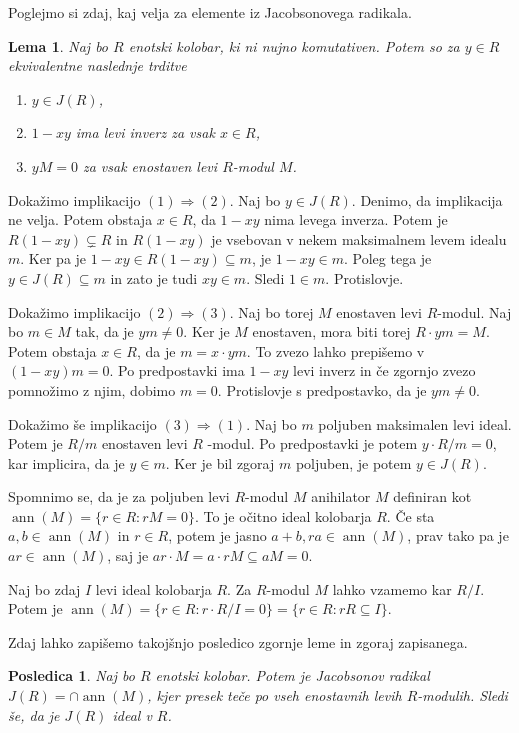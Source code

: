 \documentclass[a4paper, 12pt]{amsart}
\theoremstyle{definition} %
\theoremstyle{plain} %
\newtheorem{lema}[definicija]{Lema}
\newtheorem{posledica}[definicija]{Posledica}
\DeclareMathOperator{\ann}{ann}
\begin{document}
Poglejmo si zdaj, kaj velja za elemente iz Jacobsonovega radikala.
\begin{lema}
\label{J(R)-prvic}
Naj bo $R$ enotski kolobar, ki ni nujno komutativen. Potem so za $y\in R$ ekvivalentne naslednje trditve
 \begin{enumerate}
 \item $y\in J(R)$,
\item $1-xy$ ima levi inverz za vsak $x\in R$,
\item $ yM = 0$ za vsak enostaven levi $R$-modul $M$.
\end{enumerate}
\end{lema}

\proof
Dokažimo implikacijo $(1) \Rightarrow (2)$. Naj bo $y\in J(R)$. Denimo, da implikacija ne velja. Potem obstaja $x\in R$, da $1-xy$ nima levega inverza. Potem je $R(1-xy) \subsetneq R$ in $R(1-xy)$ je vsebovan v nekem maksimalnem levem idealu $m$. Ker pa je $1-xy \in R(1-xy) \subseteq m$, je $1-xy\in m$. Poleg tega je $y\in J(R) \subseteq m$ in zato je tudi $xy \in m$. Sledi $1\in m$. Protislovje.

Dokažimo implikacijo $(2) \Rightarrow (3)$. Naj bo torej $M$ enostaven levi $R$-modul. Naj bo $m\in M$ tak, da je $ym \neq 0$. Ker je $M$ enostaven, mora biti torej $R\cdot ym = M$. Potem obstaja $x\in R$, da je $m = x\cdot ym$. To zvezo lahko prepišemo v $(1-xy)m=0$. Po predpostavki ima $1-xy$ levi inverz in če zgornjo zvezo pomnožimo z njim, dobimo $m=0$. Protislovje s predpostavko, da je $ym\neq 0$.

Dokažimo še implikacijo $(3) \Rightarrow (1)$. Naj bo $m$ poljuben maksimalen levi ideal. Potem je $R/m$ enostaven levi $R$ -modul. Po predpostavki je potem $y  \cdot R/m = 0$, kar implicira, da je $y\in m$. Ker je bil zgoraj $m$ poljuben, je potem $y\in J(R)$.
\endproof

Spomnimo se, da je za poljuben levi $R$-modul $M$ anihilator $M$ definiran kot $\ann(M) = \{r\in R: rM = 0\}$. To je očitno ideal kolobarja $R$. Če sta $a,b\in \ann(M)$ in $r\in R$, potem je jasno $a+b, ra\in \ann(M)$, prav tako pa je $ar\in \ann(M)$, saj je $ar\cdot M = a \cdot rM \subseteq a M =0$.

Naj bo zdaj $I$ levi ideal kolobarja $R$. Za $R$-modul $M$ lahko vzamemo kar $R/I$. Potem je $\ann(M) = \{r\in R: r\cdot R/I = 0\} = \{ r\in R: rR \subseteq I\}$.

Zdaj lahko zapišemo takojšnjo posledico zgornje leme in zgoraj zapisanega. 
\begin{posledica}
\label{J(R)-presekAnihilatorjev}
Naj bo $R$ enotski kolobar. Potem je Jacobsonov radikal $J(R) = \cap \ann(M)$, kjer presek teče po vseh enostavnih levih $R$-modulih. Sledi še, da je $J(R)$ ideal v $R$.
\end{posledica}
\end{document}
